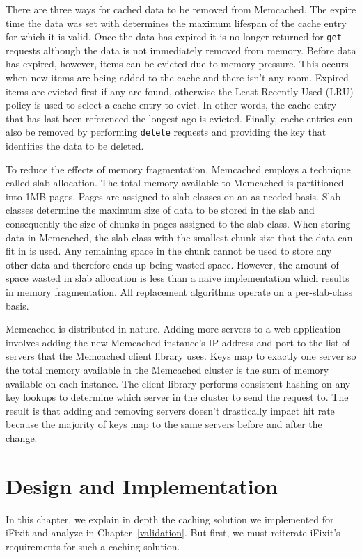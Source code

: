 \documentclass[12pt]{ucthesis}
\begin{document}
There are three ways for cached data to be removed from \textsf{Memcached}.
The expire time the data was set with determines the maximum lifespan of the cache entry for which it is valid.
Once the data has expired it is no longer returned for {\tt get} requests although the data is not immediately removed from memory.
Before data has expired, however, items can be evicted due to memory pressure.
This occurs when new items are being added to the cache and there isn't any room.
Expired items are evicted first if any are found, otherwise the Least Recently Used (LRU) policy is used to select a cache entry to evict.
In other words, the cache entry that has last been referenced the longest ago is evicted.
Finally, cache entries can also be removed by performing {\tt delete} requests and providing the key that identifies the data to be deleted.

To reduce the effects of memory fragmentation, \textsf{Memcached} employs a technique called slab allocation.
The total memory available to \textsf{Memcached} is partitioned into 1MB pages.
Pages are assigned to slab-classes on an as-needed basis.
Slab-classes determine the maximum size of data to be stored in the slab and consequently the size of chunks in pages assigned to the slab-class.
When storing data in \textsf{Memcached}, the slab-class with the smallest chunk size that the data can fit in is used.
Any remaining space in the chunk cannot be used to store any other data and therefore ends up being wasted space.
However, the amount of space wasted in slab allocation is less than a naive implementation which results in memory fragmentation.
All replacement algorithms operate on a per-slab-class basis.

\textsf{Memcached} is distributed in nature.
Adding more servers to a web application involves adding the new \textsf{Memcached} instance's IP address and port to the list of servers that the \textsf{Memcached} client library uses.
Keys map to exactly one server so the total memory available in the \textsf{Memcached} cluster is the sum of memory available on each instance.
The client library performs consistent hashing\cite{consistentHashing} on any key lookups to determine which server in the cluster to send the request to.
The result is that adding and removing servers doesn't drastically impact hit rate because the majority of keys map to the same servers before and after the change.


\chapter{Design and Implementation} \label{designAndImplementation}
In this chapter, we explain in depth the caching solution we implemented for \textsf{iFixit} and analyze in Chapter~\ref{validation}.
But first, we must reiterate \textsf{iFixit}'s requirements for such a caching solution.
\end{document}
